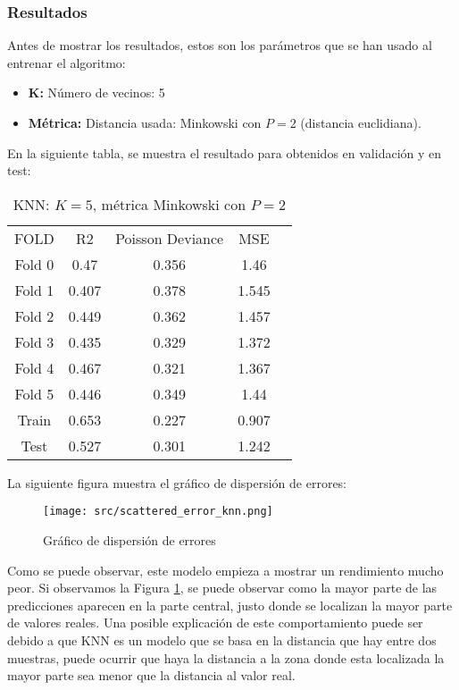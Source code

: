 \subsubsection*{Resultados}
Antes de mostrar los resultados, estos son los parámetros que se han usado al entrenar el algoritmo:
\begin{itemize}
	\item \textbf{K:} Número de vecinos: 5
	\item \textbf{Métrica:} Distancia usada: Minkowski con $P=2$ (distancia euclidiana).
\end{itemize}
En la siguiente tabla, se muestra el resultado para obtenidos en validación y en test:
\linebreak
\begin{table}[H]
	\centering
	\begin{tabular}{|c|c|c|c|c}
		\cline{1-4}
		FOLD   & R2    & Poisson Deviance & MSE   \\ \cline{1-4}
		Fold 0 & 0.47  & 0.356            & 1.46  \\  \cline{1-4}
		Fold 1 & 0.407 & 0.378            & 1.545 \\  \cline{1-4}
		Fold 2 & 0.449 & 0.362            & 1.457 \\  \cline{1-4}
		Fold 3 & 0.435 & 0.329            & 1.372 \\  \cline{1-4}
		Fold 4 & 0.467 & 0.321            & 1.367 \\  \cline{1-4}
		Fold 5 & 0.446 & 0.349            & 1.44  \\  \cline{1-4}
		Train  & 0.653 & 0.227            & 0.907 \\ \cline{1-4}
		Test   & 0.527 & 0.301            & 1.242 \\ \cline{1-4}
	\end{tabular}
	\caption{KNN: $K=5$, métrica Minkowski con $P=2$}
	\label{tab:knn_res}
\end{table}
\clearpage
La siguiente figura muestra el gráfico de dispersión de errores:
\begin{figure}[H]
	\centering
	\texttt{[image: src/scattered\_error\_knn.png]}
	\caption{Gráfico de dispersión de errores}
	\label{fig:knn_scattered}
\end{figure}
Como se puede observar, este modelo empieza a mostrar un rendimiento mucho peor. Si observamos la Figura \ref{tab:knn_res}, se puede observar como la mayor parte de las predicciones aparecen en la parte central, justo donde se localizan la mayor parte de valores reales. Una posible explicación de este comportamiento puede ser debido a que KNN es un modelo que se basa en la distancia que hay entre dos muestras, puede ocurrir que haya la distancia a la zona donde esta localizada la mayor parte sea menor que la distancia al valor real.
